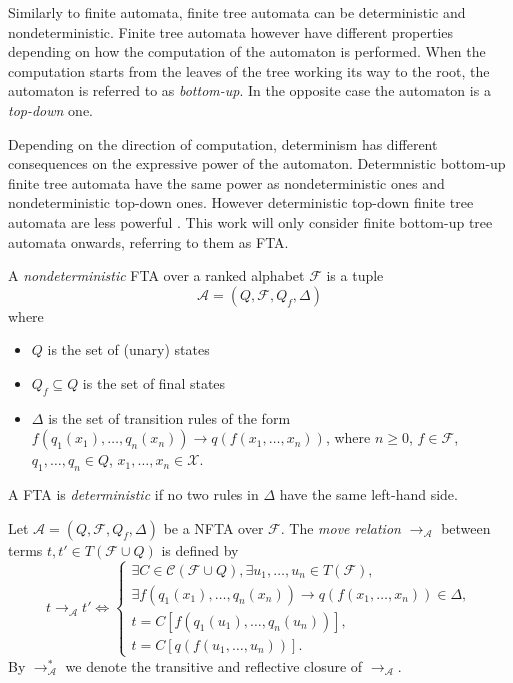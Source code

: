 Similarly to finite automata, finite tree automata can be deterministic and nondeterministic. Finite tree automata however have different properties depending on how the computation of the automaton is performed. When the computation starts from the leaves of the tree working its way to the root, the automaton is referred to as \emph{bottom-up}. In the opposite case the automaton is a \emph{top-down} one.

Depending on the direction of computation, determinism has different consequences on the expressive power of the automaton. Determnistic bottom-up finite tree automata have the same power as nondeterministic ones and nondeterministic top-down ones. However deterministic top-down finite tree automata are less powerful \cite{tata07}. This work will only consider finite bottom-up tree automata onwards, referring to them as FTA.

\begin{defn}
A \emph{nondeterministic} FTA over a ranked alphabet $\mathcal{F}$ is a tuple $$\mathcal{A} = (Q, \mathcal{F}, Q_f, \Delta)$$ where
\begin{itemize}
    \item $Q$ is the set of (unary) states
    \item $Q_f \subseteq Q$ is the set of final states
    \item $\Delta$ is the set of transition rules of the form $f(q_1(x_1), \dots, q_n(x_n)) \rightarrow q(f(x_1, \dots, x_n))$, where $n \geq 0$, $f \in \mathcal{F}$, $q_1, \dots, q_n \in Q$, $x_1, \dots, x_n \in \mathcal{X}$.
\end{itemize}
A FTA is \emph{deterministic} if no two rules in $\Delta$ have the same left-hand side.
\end{defn}

\begin{defn}
Let $\mathcal{A} = (Q, \mathcal{F}, Q_f, \Delta)$ be a NFTA over $\mathcal{F}$. The \emph{move relation} $\rightarrow_{\mathcal{A}}$ between terms $t,t' \in T(\mathcal{F} \cup Q)$ is defined by
\begin{equation*}
    t \rightarrow_{\mathcal{A}} t' \Leftrightarrow
    \begin{cases}
        \exists C \in \mathcal{C}(\mathcal{F} \cup Q), \exists u_1, \dots, u_n \in T(\mathcal{F}),\\
        \exists f(q_1(x_1), \dots, q_n(x_n)) \rightarrow q(f(x_1, \dots, x_n)) \in \Delta,\\
        t = C[f(q_1(u_1), \dots, q_n(u_n))],\\
        t = C[q(f(u_1, \dots, u_n))].
    \end{cases}
\end{equation*}
By $\rightarrow_{\mathcal{A}}^{*}$ we denote the transitive and reflective closure of $\rightarrow_{\mathcal{A}}$.
\end{defn}

